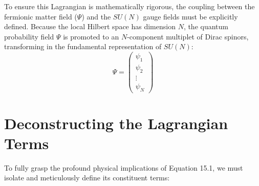 \documentclass[12pt,openany]{book}
\theoremstyle{plain}
\theoremstyle{definition}
\theoremstyle{remark}
\begin{document}
To ensure this Lagrangian is mathematically rigorous, the coupling between the fermionic matter field ($\Psi$) and the $SU(N)$ gauge fields must be explicitly defined. Because the local Hilbert space has dimension $N$, the quantum probability field $\Psi$ is promoted to an $N$-component multiplet of Dirac spinors, transforming in the fundamental representation of $SU(N)$:$$\Psi = \begin{pmatrix} \psi_1 \\ \psi_2 \\ \vdots \\ \psi_N \end{pmatrix}$$

\section{Deconstructing the Lagrangian Terms}

To fully grasp the profound physical implications of Equation 15.1, we must isolate and meticulously define its constituent terms:
\end{document}
